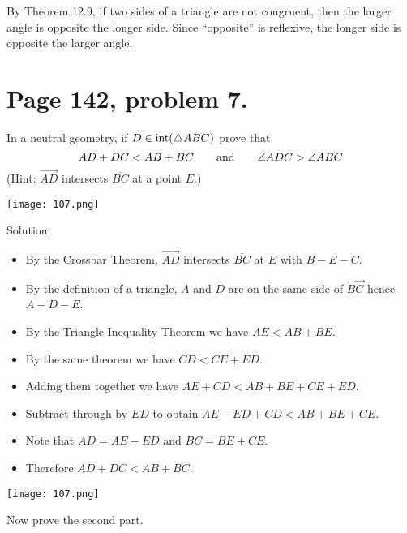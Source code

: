 \documentclass[12pt,openany]{report}
\begin{document}
\medskip
\noindent
By Theorem 12.9, if two sides of a triangle are not congruent,
then the larger angle is opposite the longer side.
Since ``opposite'' is reflexive, the longer side is opposite the larger angle.

\newpage

\section*{Page 142, problem 7.}

In a neutral geometry, if $D\in\mathop{\rm int}(\triangle ABC)$ prove that
$$AD+DC<AB+BC\qquad\hbox{and}\qquad\angle ADC>\angle ABC$$
(Hint: $\overrightarrow{AD}$ intersects $\overline{BC}$ at a point $E$.)

\texttt{[image: 107.png]}

\noindent
Solution:

\begin{itemize}

\item[]
By the Crossbar Theorem, $\overrightarrow{AD}$ intersects $\overline{BC}$ at
$E$ with $B{-}E{-}C$.

\item[]
By the definition of a triangle, $A$ and $D$ are on the same side of
$\overleftarrow B\overrightarrow C$ hence $A{-}D{-}E$.

\item[]
By the Triangle Inequality Theorem we have $AE<AB+BE$.

\item[]
By the same theorem we have $CD<CE+ED$.

\item[]
Adding them together we have $AE+CD<AB+BE+CE+ED$.

\item[]
Subtract through by $ED$ to obtain $AE-ED+CD<AB+BE+CE$.

\item[]
Note that $AD=AE-ED$ and $BC=BE+CE$.

\item[]
Therefore $AD+DC<AB+BC$.

\end{itemize}

\newpage

\texttt{[image: 107.png]}

\noindent
Now prove the second part.
\end{document}
